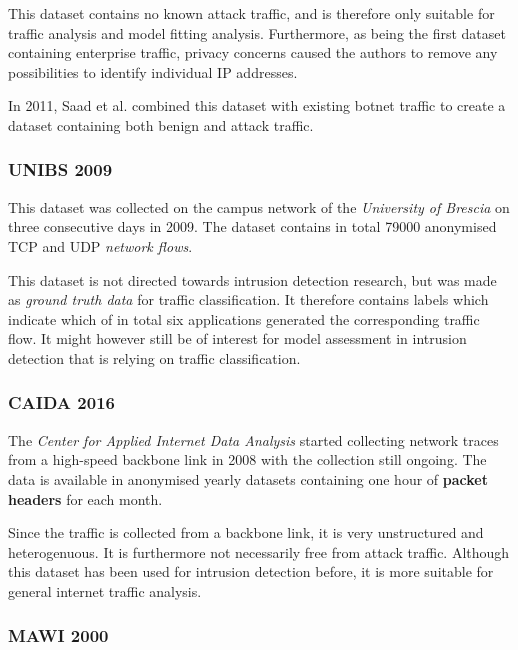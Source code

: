\documentclass[a4paper,12pt,twoside]{report}
\begin{document}
This dataset contains no known attack traffic, and is therefore only suitable for traffic analysis and model fitting analysis. Furthermore, as being the first dataset containing enterprise traffic, privacy concerns caused the authors to remove any possibilities to identify individual IP addresses.

In 2011, Saad et al. \cite{saad2011detecting} combined this dataset with existing botnet traffic to create a dataset containing both benign and attack traffic. 

\subsubsection*{UNIBS 2009\cite{UNIBS2009data}}

This dataset was collected on the campus network of the \textit{University of Brescia} on three consecutive days in 2009. The dataset contains in total 79000 anonymised TCP and UDP \textit{network flows}. 

This dataset is not directed towards intrusion detection research, but was made as \textit{ground truth data} for traffic classification. It therefore contains labels which indicate which of in total six applications generated the corresponding traffic flow. It might however still be of interest for model assessment in intrusion detection that is relying on traffic classification.

\subsubsection*{CAIDA 2016 \cite{walsworth2015caida}}

The \textit{Center for Applied Internet Data Analysis} started collecting network traces from a high-speed backbone link in 2008 with the collection still ongoing. The data is available in anonymised yearly datasets containing one hour of \textbf{packet headers} for each month. 

Since the traffic is collected from a backbone link, it is very unstructured and heterogenuous. It is furthermore not necessarily free from attack traffic. Although this dataset has been used for intrusion detection before, it is more suitable for general internet traffic analysis.


\subsubsection*{MAWI 2000 \cite{sony2000traffic}}
\end{document}
